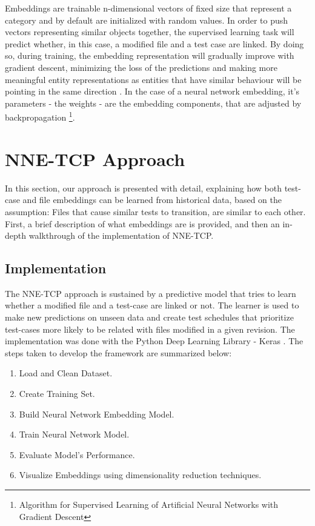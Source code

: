 \par Embeddings are trainable n-dimensional vectors of fixed size that represent a category and by default are initialized with random values. In order to push vectors representing similar objects together, the supervised learning task will predict whether, in this case, a modified file and a test case are linked. 
By doing so, during training, the embedding representation will gradually improve with gradient descent, minimizing the loss of the predictions and making more meaningful entity representations as entities that have similar behaviour will be pointing in the same direction \cite{geron_hands_on}. In the case of a neural network embedding, it's parameters - the weights - are the embedding components, that are adjusted by backpropagation \footnote{Algorithm for Supervised Learning of Artificial Neural Networks with Gradient Descent}. 


\section{NNE-TCP Approach}
%

In this section, our approach is presented with detail, explaining how both test-case and file embeddings can be learned from historical data, based on the assumption: Files that cause similar tests to transition, are similar to each other. First, a brief description of what embeddings are is provided, and then an in-depth walkthrough of the implementation of NNE-TCP.

\subsection{Implementation}

The NNE-TCP approach is sustained by a predictive model that tries to learn whether a modified file and a test-case are linked or not. The learner is used to make new predictions on unseen data and create test schedules that prioritize test-cases  more likely to be related with files modified in a given revision. The implementation was done with the Python Deep Learning Library - Keras \cite{chollet2015keras}. The steps taken to develop the framework are summarized below: 
\begin{enumerate}
	\item Load and Clean Dataset.
	\item Create Training Set.
	\item Build Neural Network Embedding Model.
	\item Train Neural Network Model.
	\item Evaluate Model's Performance.
	\item Visualize Embeddings using dimensionality reduction techniques. 
\end{enumerate}

